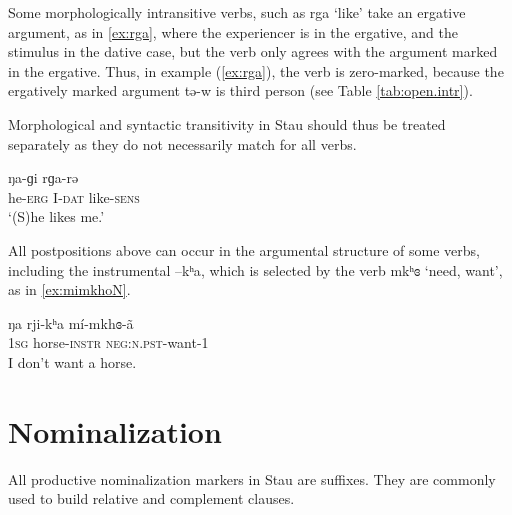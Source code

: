 \documentclass[oneside,a4paper,11pt]{article}
\newcommand{\ipa}[1]{{\phon #1}} %
\begin{document}
Some morphologically intransitive verbs, such as \ipa{rga} `like' take an ergative argument, as in \ref{ex:rga}, where the experiencer is in the ergative, and the stimulus in the dative case, but the verb only agrees with the argument marked in the ergative. Thus, in example (\ref{ex:rga}), the verb is zero-marked, because the ergatively marked argument \ipa{tə-w} is third person (see Table \ref{tab:open.intr}).

 Morphological and syntactic transitivity in Stau should thus be treated separately as they do not necessarily match for all verbs.

 \begin{exe}
\ex \label{ex:rga}
\gll \ipa{tə-w}  	\ipa{ŋa-ɡi}  	\ipa{rɡa-rə}  
 \\
he-\textsc{erg} I-\textsc{dat} like-\textsc{sens} \\
\glt `(S)he likes me.'
\end{exe}

All postpositions above can occur in the argumental structure of some verbs, including the instrumental \ipa{--kʰa}, which is selected by the verb \ipa{mkʰɞ} `need, want', as in \ref{ex:mimkhoN}.

 \begin{exe}
\ex \label{ex:mimkhoN}
\gll
\ipa{ŋa} 	\ipa{rji-kʰa} 	\ipa{mí-mkhɞ-ã} \\
\textsc{1sg} horse-\textsc{instr} \textsc{neg:n.pst}-want-1 \\
\glt I don't want a horse.
\end{exe}

%	


 


%
%
%
%
%
%

%


\section{Nominalization} \label{sec:nmlz}
All productive nominalization markers in Stau are suffixes. They are commonly used to build relative and complement clauses.
\end{document}
